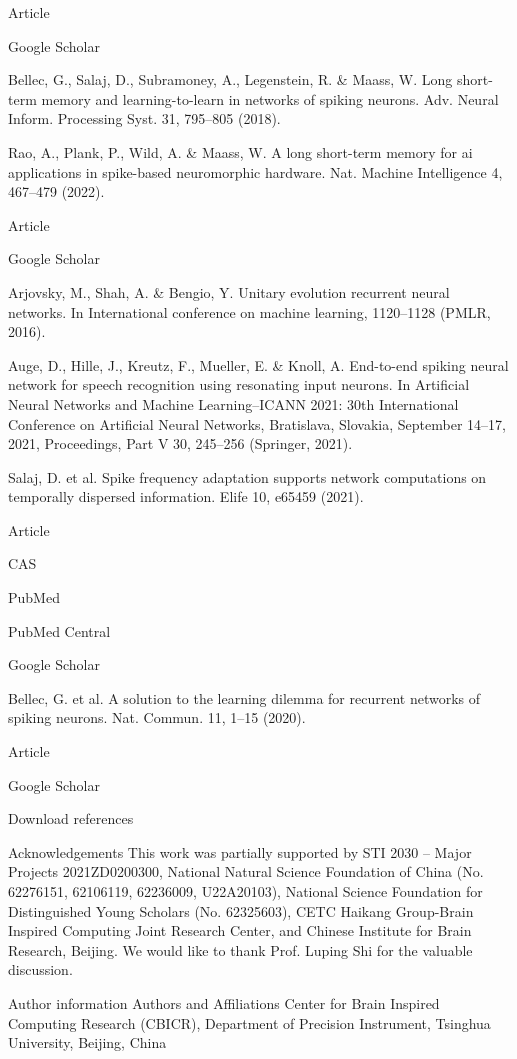Article
 
Google Scholar
 

Bellec, G., Salaj, D., Subramoney, A., Legenstein, R. & Maass, W. Long short-term memory and learning-to-learn in networks of spiking neurons. Adv. Neural Inform. Processing Syst. 31, 795–805 (2018).

Rao, A., Plank, P., Wild, A. & Maass, W. A long short-term memory for ai applications in spike-based neuromorphic hardware. Nat. Machine Intelligence 4, 467–479 (2022).

Article
 
Google Scholar
 

Arjovsky, M., Shah, A. & Bengio, Y. Unitary evolution recurrent neural networks. In International conference on machine learning, 1120–1128 (PMLR, 2016).

Auge, D., Hille, J., Kreutz, F., Mueller, E. & Knoll, A. End-to-end spiking neural network for speech recognition using resonating input neurons. In Artificial Neural Networks and Machine Learning–ICANN 2021: 30th International Conference on Artificial Neural Networks, Bratislava, Slovakia, September 14–17, 2021, Proceedings, Part V 30, 245–256 (Springer, 2021).

Salaj, D. et al. Spike frequency adaptation supports network computations on temporally dispersed information. Elife 10, e65459 (2021).

Article
 
CAS
 
PubMed
 
PubMed Central
 
Google Scholar
 

Bellec, G. et al. A solution to the learning dilemma for recurrent networks of spiking neurons. Nat. Commun. 11, 1–15 (2020).

Article
 
Google Scholar
 

Download references

Acknowledgements
This work was partially supported by STI 2030 – Major Projects 2021ZD0200300, National Natural Science Foundation of China (No. 62276151, 62106119, 62236009, U22A20103), National Science Foundation for Distinguished Young Scholars (No. 62325603), CETC Haikang Group-Brain Inspired Computing Joint Research Center, and Chinese Institute for Brain Research, Beijing. We would like to thank Prof. Luping Shi for the valuable discussion.

Author information
Authors and Affiliations
Center for Brain Inspired Computing Research (CBICR), Department of Precision Instrument, Tsinghua University, Beijing, China


